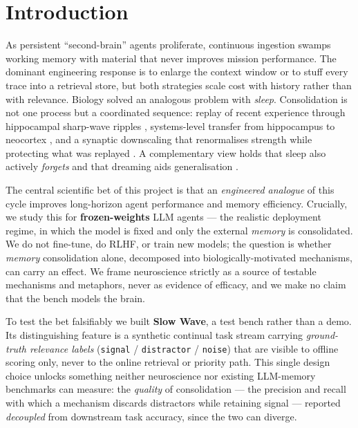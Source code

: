 \section{Introduction}\label{sec:intro}

As persistent ``second-brain'' agents proliferate, continuous ingestion swamps
working memory with material that never improves mission performance. The
dominant engineering response is to enlarge the context window or to stuff
every trace into a retrieval store, but both strategies scale cost with history
rather than with relevance. Biology solved an analogous problem with
\emph{sleep}. Consolidation is not one process but a coordinated sequence:
replay of recent experience through hippocampal sharp-wave ripples
\citep{buzsaki1989twostage,buzsaki2015ripples}, systems-level transfer from
hippocampus to neocortex \citep{mcclelland1995cls,klinzing2019systems}, and a
synaptic downscaling that renormalises strength while protecting what was
replayed \citep{tononi2006shy,tononi2014price}. A complementary view holds that
sleep also actively \emph{forgets} \citep{crick1983dreamsleep,poe2017forgetting}
and that dreaming aids generalisation \citep{hoel2021overfitted}.

The central scientific bet of this project is that an \emph{engineered analogue}
of this cycle improves long-horizon agent performance and memory efficiency.
Crucially, we study this for \textbf{frozen-weights} LLM agents --- the
realistic deployment regime, in which the model is fixed and only the external
\emph{memory} is consolidated. We do not fine-tune, do RLHF, or train new
models; the question is whether \emph{memory} consolidation alone, decomposed
into biologically-motivated mechanisms, can carry an effect. We frame
neuroscience strictly as a source of testable mechanisms and metaphors, never
as evidence of efficacy, and we make no claim that the bench models the brain.

To test the bet falsifiably we built \textbf{Slow Wave}, a test bench rather
than a demo. Its distinguishing feature is a synthetic continual task stream
carrying \emph{ground-truth relevance labels} (\texttt{signal} /
\texttt{distractor} / \texttt{noise}) that are visible to offline scoring only,
never to the online retrieval or priority path. This single design choice
unlocks something neither neuroscience nor existing LLM-memory benchmarks can
measure: the \emph{quality} of consolidation --- the precision and recall with
which a mechanism discards distractors while retaining signal --- reported
\emph{decoupled} from downstream task accuracy, since the two can diverge.

